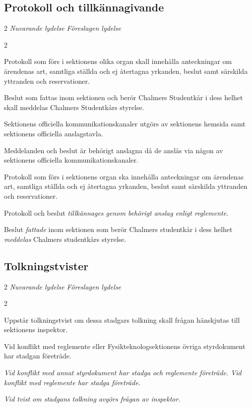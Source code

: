 \documentclass{article}
\newenvironment{lydelse}
    {\begin{paracol}{2}%
        \emph{Nuvarande lydelse}%
        \switchcolumn%
        \emph{Föreslagen lydelse}%
    \end{paracol}%
    \begin{enumerate}[label=\thesubsection.\arabic*]%
    \begin{paracol}{2}%
    }{\end{paracol}\end{enumerate}}
\begin{document}
\subsection{Protokoll och tillkännagivande}
\begin{lydelse}
  \setcounter{section}{14}
  \setcounter{subsection}{5}
  \item Protokoll som förs i sektionens olika organ skall innehålla anteckningar om ärendenas art, samtliga ställda och ej återtagna yrkanden, beslut samt särskilda yttranden och reservationer.
  \item Beslut som fattas inom sektionen och berör Chalmers Studentkår i dess helhet skall meddelas Chalmers Studentkårs styrelse.
  \item Sektionens officiella kommunikationskanaler utgörs av sektionens hemsida samt sektionens officiella anslagstavla.
  \item Meddelanden och beslut är behörigt anslagna då de anslås via någon av sektionens officiella kommunikationskanaler.
  \switchcolumn
  \item Protokoll som förs i sektionens organ ska innehålla anteckningar om ärendenas art, samtliga ställda och ej återtagna yrkanden, beslut samt särskilda yttranden och reservationer.
  \item Protokoll och beslut \emph{tillkännages genom behörigt anslag enligt reglemente.}
  \item Beslut \emph{fattade} inom sektionen som berör Chalmers studentkår i dess helhet \emph{meddelas} Chalmers studentkårs styrelse.
\end{lydelse}
\setcounter{section}{15}
\setcounter{subsection}{2}

\subsection{Tolkningstvister}
\begin{lydelse}
  \setcounter{section}{14}
  \setcounter{subsection}{4}
  \item Uppstår tolkningstvist om dessa stadgars tolkning skall frågan hänskjutas till sektionens inspektor.
  \item Vid konflikt med reglemente eller Fysikteknologsektionens övriga styrdokument har stadgan företräde.
  \switchcolumn
  \item \emph{Vid konflikt med annat styrdokument har stadga och reglemente företräde. Vid konflikt med reglemente har stadga företräde.}
  \item \emph{Vid tvist om stadgans tolkning avgörs frågan av inspektor.}
\end{lydelse}
\end{document}
